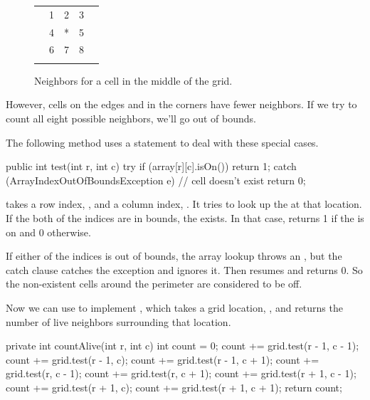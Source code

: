 \begin{figure}[!ht]
\begin{center}
\begin{tabular}{|p{1em}|p{1em}|p{1em}|p{1em}|p{1em}|}
\hline
  &   &   &   &   \\
\hline
  & 1 & 2 & 3 &   \\
\hline
  & 4 & * & 5 &   \\
\hline
  & 6 & 7 & 8 &   \\
\hline
  &   &   &   &   \\
\hline
\end{tabular}
\caption{Neighbors for a cell in the middle of the grid.}
\label{fig:neighbors}
\end{center}
\end{figure}

However, cells on the edges and in the corners have fewer neighbors.
If we try to count all eight possible neighbors, we'll go out of bounds.

The following method uses a  statement to deal with these special cases.

\begin{code}
public int test(int r, int c) {
    try {
        if (array[r][c].isOn()) {
            return 1;
        }
    } catch (ArrayIndexOutOfBoundsException e) {
        // cell doesn't exist
    }
    return 0;
}
\end{code}

 takes a row index, , and a column index, .
It tries to look up the  at that location.
If the  both of the indices are in bounds, the  exists.  In that case,  returns 1 if the  is on and 0 otherwise.

If either of the indices is out of bounds, the array lookup throws an , but the catch clause catches the exception and ignores it.
Then  resumes and returns 0.
So the non-existent cells around the perimeter are considered to be off.

Now we can use  to implement , which takes a grid location, , and returns the number of live neighbors surrounding that location.

\begin{code}
private int countAlive(int r, int c) {
    int count = 0;
    count += grid.test(r - 1, c - 1);
    count += grid.test(r - 1, c);
    count += grid.test(r - 1, c + 1);
    count += grid.test(r, c - 1);
    count += grid.test(r, c + 1);
    count += grid.test(r + 1, c - 1);
    count += grid.test(r + 1, c);
    count += grid.test(r + 1, c + 1);
    return count;
}
\end{code}

